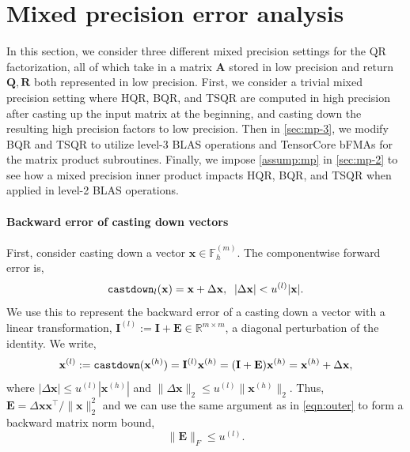 \documentclass[review,onefignum,onetabnum]{siamart190516}
\newcommand{\R}{\mathbb{R}}
\newcommand{\F}{\mathbb{F}}
\newcommand{\bb}[1]{\mathbf{#1}}
\begin{document}
\section{Mixed precision error analysis}\label{sec:mpanalysis}
%
In this section, we consider three different mixed precision settings for the QR factorization, all of which take in a matrix $\bb{A}$ stored in low precision and return $\bb{Q},\bb{R}$ both represented in low precision. 
First, we consider a trivial mixed precision setting where HQR, BQR, and TSQR are computed in high precision after casting up the input matrix at the beginning, and casting down the resulting high precision factors to low precision. 
Then in \cref{sec:mp-3}, we modify BQR and TSQR to utilize level-3 BLAS operations and TensorCore bFMAs for the matrix product subroutines. 
Finally, we impose \cref{assump:mp} in \cref{sec:mp-2} to see how a mixed precision inner product impacts HQR, BQR, and TSQR when applied in level-2 BLAS operations.

\paragraph{Backward error of casting down vectors} First, consider
casting down a vector  $\bb{x}\in\F_h^{(m)}$.
The componentwise forward error is, \[\text{\tt castdown}_{l}(\bb{x}) = \bb{x} + \Delta {\bb{x}},\;\; |\Delta\bb{x}| < u^{(l)}|\bb{x}|.\]
We use this to represent the backward error of a casting down a vector with a linear transformation, $\bb{I}^{(l)}:=\bb{I} +\bb{E}\in\R^{m\times m}$, a diagonal perturbation of the identity.
We write,
\begin{equation}
\bb{x}^{(l)} := \text{\tt castdown}(\bb{x}^{(h)}) = \bb{I}^{(l)}\bb{x}^{(h)} = (\bb{I}+\bb{E})\bb{x}^{(h)} = \bb{x}^{(h)}+\Delta \bb{x},
\end{equation}
where $|\Delta \bb{x}| \leq u^{(l)} |\bb{x}^{(h)}|$ and  $\|\Delta \bb{x}\|_2 \leq u^{(l)} \|\bb{x}^{(h)}\|_2$.
Thus, $\bb{E} = \Delta \bb{x x}^{\top}/\|\bb{x}\|_2^2$ and we can use the same argument as in \cref{eqn:outer} to form a backward matrix norm bound, 
\begin{equation}
\|\bb{E}\|_F\leq u^{(l)}. \label{eqn:castdown}
\end{equation}
\end{document}
